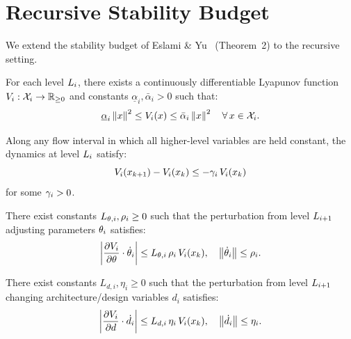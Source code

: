 \documentclass[11pt,a4paper]{article}
\begin{document}
\section{Recursive Stability Budget}
\label{sec:stability}

We extend the stability budget of Eslami \& Yu~\cite{eslami2026control}
(Theorem~2) to the recursive setting.

\begin{assumption}
\label{ass:per-level}
For each level $L_{i}$, there exists a continuously differentiable Lyapunov
function $V_{i} : \mathcal{X}_i \to \mathbb{R}_{\geq 0}$ and constants
$\underline{\alpha}_i, \bar{\alpha}_i > 0$ such that:
\begin{equation}
  \underline{\alpha}_i \left\| x \right\|^2
  \leq V_{i}(x)
  \leq \bar{\alpha}_i \left\| x \right\|^2
  \quad \forall\, x \in \mathcal{X}_i.
\end{equation}
\end{assumption}

\begin{assumption}
\label{ass:decay}
Along any flow interval in which all higher-level variables are held constant,
the dynamics at level $L_{i}$ satisfy:
\begin{equation}
  V_{i}(x_{k+1}) - V_{i}(x_k) \leq -\gamma_i \, V_{i}(x_k)
\end{equation}
for some $\gamma_i > 0$.
\end{assumption}

\begin{assumption}
\label{ass:adapt}
There exist constants $L_{\theta,i}, \rho_i \geq 0$ such that the perturbation
from level $L_{i+1}$ adjusting parameters $\theta_i$ satisfies:
\begin{equation}
  \left| \frac{\partial V_{i}}{\partial \theta} \cdot \dot{\theta}_i \right|
  \leq L_{\theta,i} \, \rho_i \, V_{i}(x_k),
  \quad
  \left\| \dot{\theta}_i \right\| \leq \rho_i.
\end{equation}
\end{assumption}

\begin{assumption}
\label{ass:design}
There exist constants $L_{d,i}, \eta_i \geq 0$ such that the perturbation from
level $L_{i+1}$ changing architecture/design variables $d_i$ satisfies:
\begin{equation}
  \left| \frac{\partial V_{i}}{\partial d} \cdot \dot{d}_i \right|
  \leq L_{d,i} \, \eta_i \, V_{i}(x_k),
  \quad
  \left\| \dot{d}_i \right\| \leq \eta_i.
\end{equation}
\end{assumption}
\end{document}
